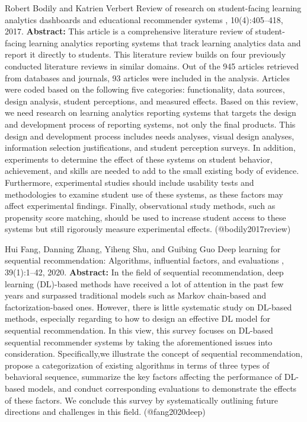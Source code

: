 \documentclass{article}
\begin{document}
\begin{thebibliography}{}
 Robert Bodily and Katrien Verbert \newblock Review of research on student-facing learning analytics dashboards and educational recommender systems , 10(4):405--418, 2017. \newblock \textbf{Abstract:} This article is a comprehensive literature review of student-facing learning analytics reporting systems that track learning analytics data and report it directly to students. This literature review builds on four previously conducted literature reviews in similar domains. Out of the 945 articles retrieved from databases and journals, 93 articles were included in the analysis. Articles were coded based on the following five categories: functionality, data sources, design analysis, student perceptions, and measured effects. Based on this review, we need research on learning analytics reporting systems that targets the design and development process of reporting systems, not only the final products. This design and development process includes needs analyses, visual design analyses, information selection justifications, and student perception surveys. In addition, experiments to determine the effect of these systems on student behavior, achievement, and skills are needed to add to the small existing body of evidence. Furthermore, experimental studies should include usability tests and methodologies to examine student use of these systems, as these factors may affect experimental findings. Finally, observational study methods, such as propensity score matching, should be used to increase student access to these systems but still rigorously measure experimental effects. \newblock (@bodily2017review)

 Hui Fang, Danning Zhang, Yiheng Shu, and Guibing Guo \newblock Deep learning for sequential recommendation: Algorithms, influential factors, and evaluations , 39(1):1--42, 2020. \newblock \textbf{Abstract:} In the field of sequential recommendation, deep learning (DL)-based methods have received a lot of attention in the past few years and surpassed traditional models such as Markov chain-based and factorization-based ones. However, there is little systematic study on DL-based methods, especially regarding to how to design an effective DL model for sequential recommendation. In this view, this survey focuses on DL-based sequential recommender systems by taking the aforementioned issues into consideration. Specifically,we illustrate the concept of sequential recommendation, propose a categorization of existing algorithms in terms of three types of behavioral sequence, summarize the key factors affecting the performance of DL-based models, and conduct corresponding evaluations to demonstrate the effects of these factors. We conclude this survey by systematically outlining future directions and challenges in this field. \newblock (@fang2020deep)


\end{thebibliography}
\end{document}
